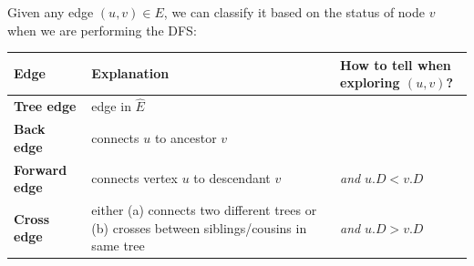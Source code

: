 \documentclass[11  pt]{exam}
\begin{document}
	Given any edge $(u,v) \in E$, we can classify it based on the status of node $v$ when we are performing the DFS:\\
	
	
	\begin{tabular}{| l | p{8cm} | p{6cm} |}
		\hline
		Edge & Explanation & How to tell when exploring $(u,v)$? \\
		\hline
		\textbf{Tree edge}  & edge in $\hat{E}$ & %
		\\
		\hline
		\textbf{Back edge} & connects $u$ to ancestor $v$ & %
		\\
		\hline
		\textbf{Forward edge} & connects vertex $u$ to descendant $v$ & \phantom{spaceasdfasdf2xsdf} \emph{and} $u.D < v.D$\\
		\hline
		\textbf{Cross edge} & either (a) connects two different trees or (b) crosses between siblings/cousins in same tree &  \phantom{spaceasdfasdf2xsdf} \emph{and} $u.D > v.D$\\
		\hline
	\end{tabular}
	
	\newpage
\end{document}
